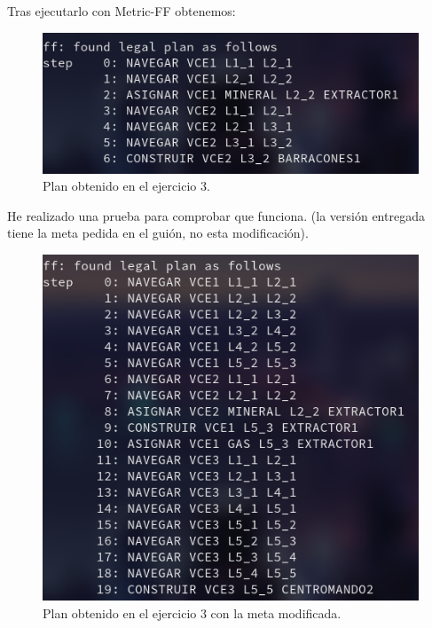 \documentclass[10pt, spanish]{article}
\begin{document}
\begin{multicols}{2}

Tras ejecutarlo con Metric-FF obtenemos:


\begin{figure}[H]
	\centering
	\vspace*{-1cm}\includegraphics[scale=0.2]{plan3.png}
	\caption{Plan obtenido en el ejercicio 3.}
	\label{plan3}
\end{figure}

\end{multicols}


\begin{multicols}{2}
He realizado una prueba para comprobar que funciona. (la versión entregada tiene la meta pedida en el guión, no esta modificación).

\begin{figure}[H]
	\centering
	\includegraphics[scale=0.2]{plan3C.png}
	\caption{Plan obtenido en el ejercicio 3 con la meta modificada.}
	\label{plan3C}
\end{figure}



\end{multicols}
\end{document}
